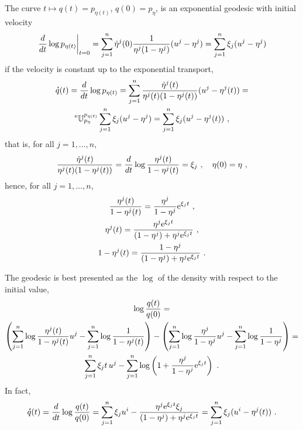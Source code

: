 \documentclass[12pt,a4paper]{amsart}
\theoremstyle{remark}
\begin{document}
The curve $t \mapsto q(t) = p_{\eta(t)}$, $q(0) = p_{\eta}$, is an exponential geodesic with initial velocity
\begin{equation}
  \label{eq:50}
\left. \frac{d}{dt} \log p_{\eta(t)} \right|_{t=0} = \sum_{j=1}^n \dot \eta^j(0) \frac{1}{\eta^j(1 - \eta^j)} (u^j - \eta^j) = \sum_{j=1}^n \xi_j (u^j - \eta^j)
\end{equation}
if the velocity is constant up to the exponential transport,
\begin{multline}
  \label{eq:15a}
\accentset{\star}{q}(t) = \frac{d}{dt} \log p_{\eta(t)} =  \sum_{j=1}^n \frac{\dot \eta^j(t)}{\eta^j(t)(1 - \eta^j(t))} (u^j - \eta^j(t)) = \\ \prescript{\text{e}}{} {\mathbb U} _ {p_\eta} ^ {p_{\eta(t)}} \sum_{j=1}^n \xi_j (u^j - \eta^j) = \sum_{j=1}^n \xi_j (u^j - \eta^j(t)) \ ,  
\end{multline}
that is, for all $j = 1,\dots,n$,
\begin{equation}
  \label{eq:16a}
  \frac {\dot \eta^j(t)} {\eta^j(t)(1-\eta^j(t))} = \derivby t \log \frac {\eta^j(t)} {1-\eta^j(t)} = \xi_j \ , \quad  \eta(0) = \eta \ ,
\end{equation}
hence, for all $j=1,\dots, n$,
\begin{gather}
  \label{eq:35}
  \frac{\eta^j(t)}{1-\eta^j(t)} = \frac{\eta^j}{1-\eta^j}\mathrm{e}^{\xi_j t} \ , \\
  \label{eq:33}
\eta^j(t) = \frac{\eta^j\mathrm{e}^{\xi_jt}} {(1-\eta^j) + \eta^j\mathrm{e}^{\xi_jt}} \ , \\  
  \label{eq:34}
  1 - \eta^j(t) = \frac{1 - \eta^j} {(1-\eta^j) + \eta^j\mathrm{e}^{\xi_jt}} \ .
\end{gather}

The geodesic is best presented as the $\log$ of the density with respect to the initial value,
\begin{multline}
  \label{eq:36}
  \log\frac{q(t)}{q(0)} = \\
  \left(\sum_{j=1}^n \log \frac {\eta^j(t)}{1 - \eta^j(t)} u^j - \sum_{j=1}^n \log \frac 1 {1 - \eta^j(t)}\right) - \left(\sum_{j=1}^n \log \frac {\eta^j}{1-\eta^j} u^j- \sum_{j=1}^n \log \frac 1 {1 - \eta^j} \right) = \\ \sum_{j=1}^n \xi_jt\, u^j - \sum_{j=1}^n \log\left(1 + \frac{\eta^j}{1-\eta^j}\mathrm{e}^{\xi_jt}\right) \ .
\end{multline}
In fact,
\begin{equation}
  \label{eq:37}
  \velocity q(t) = \derivby t \log \frac{q(t)}{q(0)} = \sum_{j=1}^n \xi_j u^i - \frac{\eta^j \euler^{\xi_j t} \xi_j}{(1-\eta^j)+\eta^j \euler^{\xi_j t}} = \sum_{j=1}^n \xi_j (u^i - \eta^j(t)) \ .
\end{equation}
\end{document}
